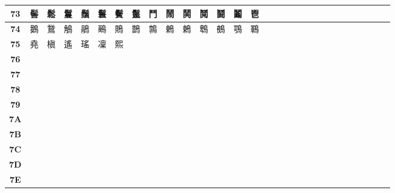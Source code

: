 \begin{table}[H]
\begin{tabular}{|Sc|Sc|Sc|Sc|Sc|Sc|Sc|Sc|Sc|Sc|Sc|Sc|Sc|Sc|Sc|}
\textbf{73} & 髻 & 鬆 & 鬘 & 鬚 & 鬟 & 鬢 & 鬣 & 鬥 & 鬧 & 鬨 & 鬩 & 鬪 & 鬮 & 鬯 \\ \hline
\textbf{74} & 鵝 & 鵞 & 鵤 & 鵑 & 鵐 & 鵙 & 鵲 & 鶉 & 鶇 & 鶫 & 鵯 & 鵺 & 鶚 & 鶤 \\ \hline
\textbf{75} & 堯 & 槇 & 遙 & 瑤 & 凜 & 熙 &  &  &  &  &  &  &  &  \\ \hline
\textbf{76} &  &  &  &  &  &  &  &  &  &  &  &  &  &  \\ \hline
\textbf{77} &  &  &  &  &  &  &  &  &  &  &  &  &  &  \\ \hline
\textbf{78} &  &  &  &  &  &  &  &  &  &  &  &  &  &  \\ \hline
\textbf{79} &  &  &  &  &  &  &  &  &  &  &  &  &  &  \\ \hline
\textbf{7A} &  &  &  &  &  &  &  &  &  &  &  &  &  &  \\ \hline
\textbf{7B} &  &  &  &  &  &  &  &  &  &  &  &  &  &  \\ \hline
\textbf{7C} &  &  &  &  &  &  &  &  &  &  &  &  &  &  \\ \hline
\textbf{7D} &  &  &  &  &  &  &  &  &  &  &  &  &  &  \\ \hline
\textbf{7E} &  &  &  &  &  &  &  &  &  &  &  &  &  &  \\ \hline
\end{tabular}
\end{table}

